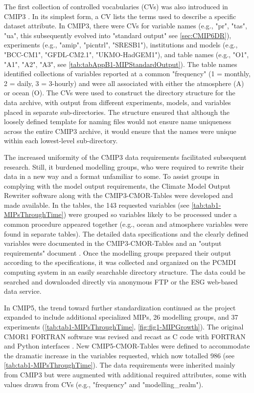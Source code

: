 \documentclass[manuscript]{copernicus}
\begin{document}
The first collection of controlled vocabularies (CVs) was also introduced in CMIP3 \citep[e.g.,][]{taylor_pcmdi_2005}. In its simplest form, a CV lists the terms used to describe a specific dataset attribute. In CMIP3, there were CVs for variable names (e.g., "pr", "tas", "ua", this subsequently evolved into "standard output" see \autoref{sec:CMIP6DR}), experiments (e.g., "amip", "picntrl", "SRESB1"), institutions and models (e.g., "BCC-CM1", "GFDL-CM2.1", "UKMO-HadGEM1"), and table names (e.g., "O1", "A1", "A2", "A3", see \autoref{tab:tabAppB1-MIPStandardOutput}). The table names identified collections of variables reported at a common "frequency" (1 = monthly, 2 = daily, 3 = 3-hourly) and were all associated with either the atmosphere (A) or ocean (O). The CVs were used to construct the directory structure for the data archive, with output from different experiments, models, and variables placed in separate sub-directories. The structure ensured that although the loosely defined template for naming files would not ensure name uniqueness across the entire CMIP3 archive, it would ensure that the names were unique within each lowest-level sub-directory.

The increased uniformity of the CMIP3 data requirements facilitated subsequent research. Still, it burdened modelling groups, who were required to rewrite their data in a new way and a format unfamiliar to some. To assist groups in complying with the model output requirements, the Climate Model Output Rewriter software \citep[CMOR1;][]{taylor_cmor_2006} along with the CMIP3-CMOR-Tables \citep{doutriaux_cmip3_2005} were developed and made available. In the tables, the 143 requested variables (see \autoref{tab:tab1-MIPsThroughTime}) were grouped so variables likely to be processed under a common procedure appeared together (e.g., ocean and atmosphere variables were found in separate tables). The detailed data specifications and the clearly defined variables were documented in the CMIP3-CMOR-Tables and an "output requirements" document \citep{taylor_pcmdi_2005}. Once the modelling groups prepared their output according to the specifications, it was collected and organized on the PCMDI computing system in an easily searchable directory structure. The data could be searched and downloaded directly via anonymous FTP or the ESG web-based data service.

In CMIP5, the trend toward further standardization continued as the project expanded to include additional specialized MIPs, 26 modelling groups, and 37 experiments (\autoref{tab:tab1-MIPsThroughTime}, \autoref{fig:fig1-MIPGrowth}). The original CMOR1 FORTRAN software was revised and recast as C code with FORTRAN and Python interfaces \citep{doutriaux_cmor_2011}. New CMIP5-CMOR-Tables \citep{doutriaux_cmip5_2013} were defined to accommodate the dramatic increase in the variables requested, which now totalled 986 (see \autoref{tab:tab1-MIPsThroughTime}). The data requirements were inherited mainly from CMIP3 but were augmented with additional required attributes, some with values drawn from CVs (e.g., "frequency" and "modelling\_realm").
\end{document}
